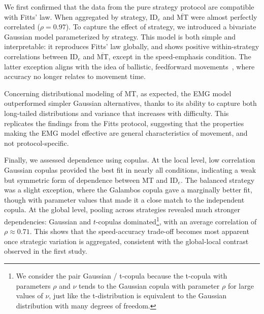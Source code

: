 \documentclass[acmlarge, manuscript,review]{acmart}
\newcommand{\mmt}{\ensuremath{\overline{\mt}}\xspace}
\newcommand{\mt}{\ensuremath{{\text{MT}}}\xspace}
\newcommand{\ide}{\ensuremath{{\text{ID}_e}}\xspace}
\begin{document}
We first confirmed that the data from the pure strategy protocol are compatible with Fitts' law. When aggregated by strategy, \ide and \mmt were almost perfectly correlated ($\rho = 0.97$). To capture the effect of strategy, we introduced a bivariate Gaussian model parameterized by strategy. This model is both simple and interpretable: it reproduces Fitts' law globally, and shows positive within-strategy correlations between \ide and \mmt, except in the speed-emphasis condition. The latter exception aligns with the idea of ballistic, feedforward movements~\cite{gan1988,crossman1957}, where accuracy no longer relates to movement time.

Concerning distributional modeling of MT, as expected, the EMG model outperformed simpler Gaussian alternatives, thanks to its ability to capture both long-tailed distributions and variance that increases with difficulty. This replicates the findings from the Fitts protocol, suggesting that the properties making the EMG model effective are general characteristics of movement, and not protocol-specific.

Finally, we assessed dependence using copulas. At the local level, low correlation Gaussian copulas provided the best fit in nearly all conditions, indicating a weak but symmetric form of dependence between MT and \ide. The balanced strategy was a slight exception, where the Galambos copula gave a marginally better fit, though with parameter values that made it a close match to the independent copula. At the global level, pooling across strategies revealed much stronger dependencies: Gaussian and $t$-copulas dominated\footnote{We consider the pair Gaussian / t-copula because the t-copula with parameters $\rho$ and $\nu$ tends to the Gaussian copula with parameter $\rho$ for large values of $\nu$, just like the t-distribution is equivalent to the Gaussian distribution with many degrees of freedom. %
}, with an average correlation of $\rho \approx 0.71$. This shows that the speed-accuracy trade-off becomes most apparent once strategic variation is aggregated, consistent with the global-local contrast observed in the first study.
\end{document}
